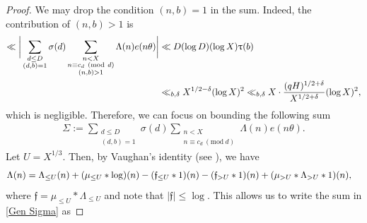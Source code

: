 \documentclass[12pt]{amsart}
\numberwithin{equation}{section}
\theoremstyle{remark}
\theoremstyle{definition}
\newcommand{\imod}[1]{\ (\mathrm{mod}\ #1)}
\begin{document}
\begin{proof}
We may drop the condition $(n, b)=1$ in the sum. Indeed, the contribution of $(n, b)>1$ is
\begin{align}\notag
\ll \bigg|\sum_{\substack{d\leq D\\(d, b)=1}}{\sigma}(d)\sum_{\substack{n<X\\n\equiv c_d\imod d\\(n, b)>1}}\Lambda(n)e(n\theta)\bigg| & \ll D(\log D)(\log X)\uptau(b)\\
\notag & \ll_{b, \delta}X^{1/2-\delta}(\log X)^2 \ll_{b, \delta} X\cdot \dfrac{(qH)^{1/2+\delta}}{X^{1/2+\delta}}(\log X)^2,
\end{align}
which is negligible. Therefore, we can focus on bounding the following sum
\begin{align}\label{Gen Sigma}
\Sigma:=\sum_{\substack{d\leq D\\(d,b)=1}}{\sigma}(d)\sum_{\substack{n<X\\n\equiv c_d\imod d}}\Lambda(n)e(n\theta).
\end{align}
Let $U=X^{1/3}$. Then, by Vaughan's identity (see \cite[Lemma 23.1]{kou}), we have
\begin{align}\notag
\Lambda(n) &= \Lambda_{\leq U}(n) + (\mu_{\leq U}*\log)(n) - (\mathfrak{f}_{\leq U}*1)(n) - (\mathfrak{f}_{> U}*1)(n)+ (\mu_{>U}*\Lambda_{>U}*1)(n),
\end{align}
where $\mathfrak{f} = \mu_{\leq U}*\Lambda_{\leq U}$ and note that $|\mathfrak{f}|\leq \log $. This allows us to write the sum in \eqref{Gen Sigma} as 


\end{proof}
\end{document}
